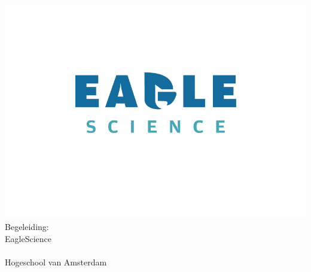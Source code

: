 
\begin{titlepage}

    \begin{addmargin}[-1cm]{-3cm}
        \begin{center}
            \large

            \hfill
            \vfill

            \begingroup
            {\color[HTML]{27406B}\spacedallcaps {\Huge\myTitle} \\ \bigskip} %
            {\color[HTML]{84C6C8}\Large\mySubtitle \\ \medskip}

            \endgroup
            \spacedlowsmallcaps{\large\myName} %

            \vfill

            \includegraphics[width=15cm]{gfx/EagleScience_Logo_on_white} \\  %


            Begeleiding:\\ \bigskip
            EagleScience\\
            \myStagebegeleider \\
            \medskip
            Hogeschool van Amsterdam\\
            \myHvABegeleider \\ \bigskip \bigskip \bigskip


            \myTime %

            \vfill

        \end{center}
    \end{addmargin}

\end{titlepage}
